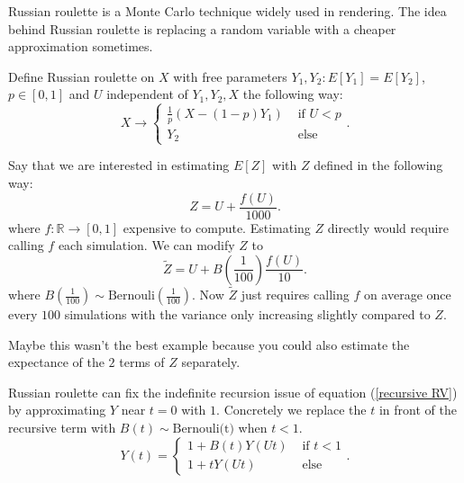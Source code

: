 \documentclass[a4paper,12pt]{article}
\begin{document}
Russian roulette is a Monte Carlo technique widely used in rendering. The idea behind
Russian roulette is replacing a random variable with a cheaper approximation sometimes.

\begin{definition} \label{Russian roulette}
    Define Russian roulette on $X$ with free parameters
    $Y_{1},Y_{2}: E[Y_{1}] = E[Y_{2}]$, $p \in [0,1]$ and $U$
    independent of $Y_{1},Y_{2},X$ the following way:
    \[
        X \rightarrow \begin{cases}
            \frac{1}{p}(X- (1-p)Y_{1}) & \text{ if } U<p \\
            Y_{2}                      & \text{ else }
        \end{cases}
        .\]
\end{definition}

\begin{example}
    Say that we are interested in estimating $E[Z]$ with $Z$
    defined in the following way:
    \[
        Z = U + \frac{f(U)}{1000}
        .\]
    where $f:\mathbb{R} \rightarrow [0,1]$ expensive to compute.
    Estimating $Z$ directly would require calling $f$ each
    simulation. We can modify $Z$ to
    \[
        \tilde{Z} = U + B\left(\frac{1}{100}\right)\frac{f(U)}{10}
        .\]
    where $B(\frac{1}{100}) \sim \text{Bernouli}(\frac{1}{100})$. Now $\tilde{Z}$
    just requires calling $f$ on average once every $100$ simulations with the variance
    only increasing slightly compared to $Z$.
\end{example}

Maybe this wasn't the best example because you could also estimate the expectance of the
$2$ terms of $Z$ separately.

\begin{example}
    Russian roulette can fix the indefinite recursion issue of
    equation (\ref{recursive RV}) by approximating $Y$ near $t = 0$ with $1$. Concretely
    we replace the $t$ in front of the recursive term with $B(t) \sim \text{Bernouli(t)}$
    when $t<1$.
    \[
        Y(t) =
        \begin{cases}
            1 + B(t)Y(Ut) & \text{ if } t<1 \\
            1 + tY(Ut)    & \text{ else}
        \end{cases}
        .\]
\end{example}

\vspace{0.2cm}
\end{document}
